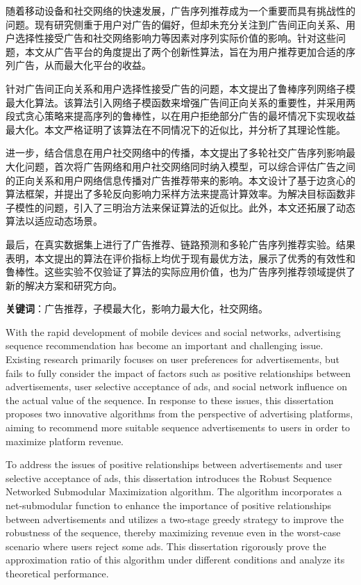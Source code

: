 \cleardoublepage
{}

随着移动设备和社交网络的快速发展，广告序列推荐成为一个重要而具有挑战性的问题。现有研究侧重于用户对广告的偏好，但却未充分关注到广告间正向关系、用户选择性接受广告和社交网络影响力等因素对序列实际价值的影响。针对这些问题，本文从广告平台的角度提出了两个创新性算法，旨在为用户推荐更加合适的序列广告，从而最大化平台的收益。

针对广告间正向关系和用户选择性接受广告的问题，本文提出了鲁棒序列网络子模最大化算法。该算法引入网络子模函数来增强广告间正向关系的重要性，并采用两段式贪心策略来提高序列的鲁棒性，以在用户拒绝部分广告的最坏情况下实现收益最大化。本文严格证明了该算法在不同情况下的近似比，并分析了其理论性能。

进一步，结合信息在用户社交网络中的传播，本文提出了多轮社交广告序列影响最大化问题，首次将广告网络和用户社交网络同时纳入模型，可以综合评估广告之间的正向关系和用户网络信息传播对广告推荐带来的影响。本文设计了基于边贪心的算法框架，并提出了多轮反向影响力采样方法来提高计算效率。为解决目标函数非子模性的问题，引入了三明治方法来保证算法的近似比。此外，本文还拓展了动态算法以适应动态场景。

最后，在真实数据集上进行了广告推荐、链路预测和多轮广告序列推荐实验。结果表明，本文提出的算法在评价指标上均优于现有最优方法，展示了优秀的有效性和鲁棒性。这些实验不仅验证了算法的实际应用价值，也为广告序列推荐领域提供了新的解决方案和研究方向。


\textbf{关键词}：广告推荐，子模最大化，影响力最大化，社交网络。


\cleardoublepage
{}

With the rapid development of mobile devices and social networks, advertising sequence recommendation has become an important and challenging issue. Existing research primarily focuses on user preferences for advertisements, but fails to fully consider the impact of factors such as positive relationships between advertisements, user selective acceptance of ads, and social network influence on the actual value of the sequence. In response to these issues, this dissertation proposes two innovative algorithms from the perspective of advertising platforms, aiming to recommend more suitable sequence advertisements to users in order to maximize platform revenue.

To address the issues of positive relationships between advertisements and user selective acceptance of ads, this dissertation introduces the Robust Sequence Networked Submodular Maximization algorithm. The algorithm incorporates a net-submodular function to enhance the importance of positive relationships between advertisements and utilizes a two-stage greedy strategy to improve the robustness of the sequence, thereby maximizing revenue even in the worst-case scenario where users reject some ads. This dissertation rigorously prove the approximation ratio of this algorithm under different conditions and analyze its theoretical performance.


